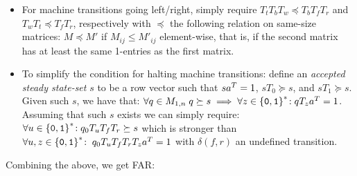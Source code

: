 \begin{itemize}

    \item For machine transitions going left/right, simply require $T_t T_b T_w\preceq T_b T_f T_r$ and $T_w T_t\preceq T_f T_r$, respectively with $\preceq$ the following relation on same-size matrices: $M\preceq M'$ if $M_{ij}\le M'_{ij}$ element-wise, that is, if the second matrix has at least the same 1-entries as the first matrix.

    \item To simplify the condition for halting machine transitions: define an \emph{accepted steady state-set} $s$ to be a row vector such that $sa^{T} = 1$, $s T_0\succeq s$, and $s T_1\succeq s$. Given such $s$, we have that: $\forall q\in M_{1,n}\; q \succeq s\implies \forall z\in\left\{\texttt{0},\texttt{1}\right\}^*\!: qT_{z}a^{T} = 1$. Assuming that such $s$ exists we can simply require: $\forall u\in\left\{\texttt{0},\texttt{1}\right\}^*\!: q_0T_u T_f T_r \succeq s$ which is stronger than $\forall u,z\in\left\{\texttt{0},\texttt{1}\right\}^*\!: \; q_0 T_u T_f T_r T_z a^{T} = 1$ with $\delta(f,r)$ an undefined transition.



\end{itemize}

Combining the above, we get FAR:



